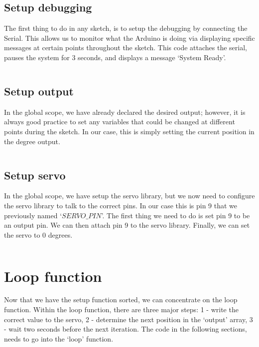 \documentclass[11pt,a4paper]{article}
\begin{document}
\subsection{Setup debugging}
The first thing to do in any sketch, is to setup the debugging by connecting the Serial. This allows us to monitor what the Arduino is doing via displaying specific messages at certain points throughout the sketch. This code attaches the serial, pauses the system for 3 seconds, and displays a message `System Ready'.\\
\vspace{-1.75em}
\inputminted{arduino}{./src/3-setup-debug.txt}
\vspace{-.5em}

\subsection{Setup output}
In the global scope, we have already declared the desired output; however, it is always good practice to set any variables that could be changed at different points during the sketch. In our case, this is simply setting the current position in the degree output.\\

\vspace{-1.75em}
\inputminted{arduino}{./src/4-setup-output.txt}
\vspace{-.5em}

\subsection{Setup servo}
In the global scope, we have setup the servo library, but we now need to configure the servo library to talk to the correct pins. In our case this is pin 9 that we previously named `$SERVO\_PIN$'. The first thing we need to do is set pin 9 to be an output pin. We can then attach pin 9 to the servo library. Finally, we can set the servo to 0 degrees.\\

\vspace{-1.75em}
\inputminted{arduino}{./src/5-setup-servo.txt}
\vspace{-.5em}

\section{Loop function}
Now that we have the setup function sorted, we can concentrate on the loop function. Within the loop function, there are three major steps: 1 - write the correct value to the servo, 2 - determine the next position in the `output' array, 3 - wait two seconds before the next iteration. The code in the following sections, needs to go into the `loop' function.\\
\end{document}
